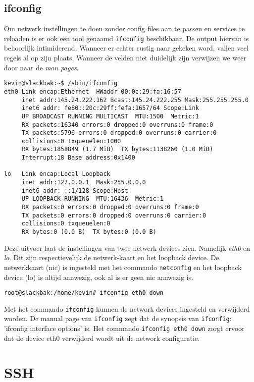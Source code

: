\subsection{ifconfig}
Om netwerk instellingen te doen zonder config files aan te passen en services te reloaden is er ook een tool genaamd \texttt{ifconfig} beschikbaar. De output hiervan is behoorlijk intimiderend. Wanneer er echter rustig naar gekeken word, vallen veel regels al op zijn plaats. Wanneer de velden niet duidelijk zijn verwijzen we weer door naar de \emph{man pages}. 
\begin{lstlisting}
kevin@slackbak:~$ /sbin/ifconfig 
eth0 Link encap:Ethernet  HWaddr 00:0c:29:fa:16:57  
     inet addr:145.24.222.162 Bcast:145.24.222.255 Mask:255.255.255.0
     inet6 addr: fe80::20c:29ff:fefa:1657/64 Scope:Link
     UP BROADCAST RUNNING MULTICAST  MTU:1500  Metric:1
     RX packets:16340 errors:0 dropped:0 overruns:0 frame:0
     TX packets:5796 errors:0 dropped:0 overruns:0 carrier:0
     collisions:0 txqueuelen:1000 
     RX bytes:1858849 (1.7 MiB)  TX bytes:1138260 (1.0 MiB)
     Interrupt:18 Base address:0x1400 

lo   Link encap:Local Loopback  
     inet addr:127.0.0.1  Mask:255.0.0.0
     inet6 addr: ::1/128 Scope:Host
     UP LOOPBACK RUNNING  MTU:16436  Metric:1
     RX packets:0 errors:0 dropped:0 overruns:0 frame:0
     TX packets:0 errors:0 dropped:0 overruns:0 carrier:0
     collisions:0 txqueuelen:0 
     RX bytes:0 (0.0 B)  TX bytes:0 (0.0 B)
\end{lstlisting}%
Deze uitvoer laat de instellingen van twee netwerk devices zien. Namelijk \emph{eth0} en \emph{lo}. Dit zijn respectievelijk de netwerk-kaart en het loopback device. De netwerkkaart (nic) is ingesteld met het commando \texttt{netconfig} en het loopback device (lo) is altijd aanwezig, ook al is er geen nic aanwezig is. 
\begin{lstlisting}
root@slackbak:/home/kevin# ifconfig eth0 down
\end{lstlisting}
Met het commando \texttt{ifconfig} kunnen de network devices ingesteld en verwijderd worden. De manual page van \texttt{ifconfig} zegt dat de synopsis van \texttt{ifconfig}: 'ifconfig interface options' is. Het commando \texttt{ifconfig eth0 down} zorgt ervoor dat de device eth0 verwijderd wordt uit de network configuratie.

\section{SSH}
